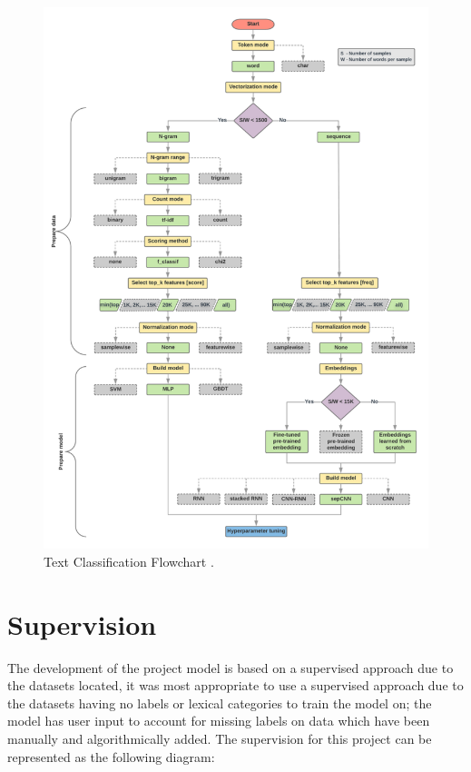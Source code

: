 \begin{figure}[H]
    \centering
    \includegraphics[width=\textwidth]{figures/chapter-5/GooglePlan.pdf}
    \caption[GooglePlan]{Text Classification Flowchart \parencite{google2021TCF}.
    \label{fig:GooglePlan}}
\end{figure}

\section{Supervision}

The development of the project model is based on a supervised approach due to the datasets located, it was most appropriate to use a supervised approach due to the datasets having no labels or lexical categories to train the model on; the model has user input to account for missing labels on data which have been manually and algorithmically added. The supervision for this project can be represented as the following diagram:

